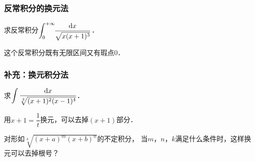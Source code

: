 \documentclass[14pt,notheorems,leqno,xcolor={rgb}]{beamer} %
\begin{document}
\begin{frame}
\frametitle{反常积分的换元法}
\begin{example}
求反常积分$\displaystyle\int_0^{+\infty}\!\!\frac{\mathop{}\!\mathrm{d} x}{\sqrt{x(x+1)^3}}$．
\end{example}
\begin{remark*}
这个反常积分既有无限区间又有瑕点$0$．
\end{remark*}
\end{frame}

\begin{rframe}
\frametitle{补充：换元积分法}
\begin{puzzle}[习题4--4第24题]%
求$\displaystyle\int\frac{\mathop{}\!\mathrm{d} x}{\sqrt[3]{(x+1)^2(x-1)^4}}$．
\end{puzzle}
\pause
\begin{solution}
用$x+1=\dfrac1t$换元，可以去掉$(x+1)$部分．
\end{solution}
\vpause
\begin{thinking}
对形如$\sqrt[k]{(x+a)^m(x+b)^n}$的不定积分，
当$m$，$n$，$k$满足什么条件时，这样换元可以去掉根号？
\end{thinking}
\end{rframe}
\end{document}
